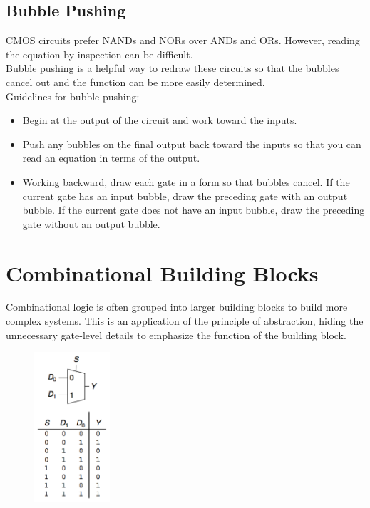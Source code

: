 \documentclass[12pt]{article}
\theoremstyle{definition}
\begin{document}
  \subsection{Bubble Pushing}
  CMOS circuits prefer NANDs and NORs over ANDs and ORs.
  However, reading the equation by inspection can be difficult. \\
  Bubble pushing is a helpful way to redraw these circuits so that the bubbles cancel out and the function can be more easily determined. \\
  Guidelines for bubble pushing:
  \begin{itemize}
    \item Begin at the output of the circuit and work toward the inputs.
    \item Push any bubbles on the final output back toward the inputs so that you can read an equation in terms of the output.
    \item Working backward, draw each gate in a form so that bubbles cancel. If the current gate has an input bubble, draw the preceding gate with an output bubble. If the current gate does not have an input bubble, draw the preceding gate without an output bubble.
  \end{itemize}

  \section{Combinational Building Blocks}
  Combinational logic is often grouped into larger building blocks to build more complex systems.
  This is an application of the principle of abstraction, hiding the unnecessary gate-level details to emphasize the function of the building block.

  \begin{figure}
    \includegraphics[width=0.25\textwidth]{pictures/2_1_mux.png}
  \end{figure}
\end{document}
